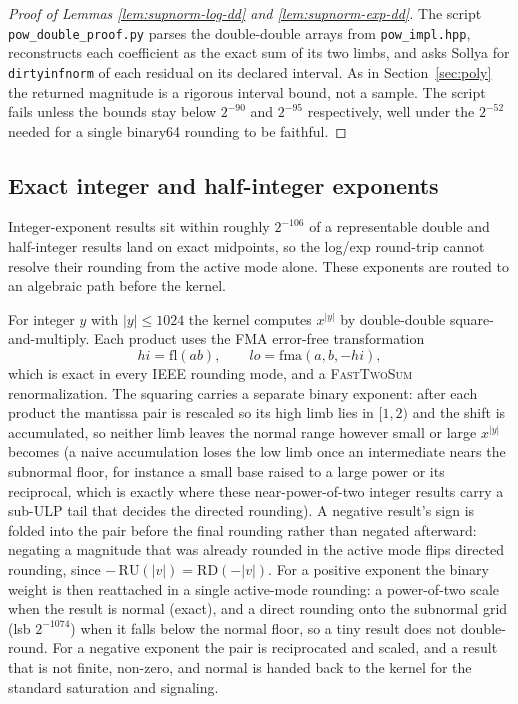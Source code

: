\documentclass[11pt]{article}
\theoremstyle{plain}
\theoremstyle{remark}
\begin{document}
\begin{proof}[Proof of Lemmas \ref{lem:supnorm-log-dd} and \ref{lem:supnorm-exp-dd}]
The script \texttt{pow\_double\_proof.py} parses the double-double arrays from
\texttt{pow\_impl.hpp}, reconstructs each coefficient as the exact sum of its two
limbs, and asks Sollya for \texttt{dirtyinfnorm} of each residual on its declared
interval.  As in Section~\ref{sec:poly} the returned magnitude is a rigorous
interval bound, not a sample.  The script fails unless the bounds stay below
$2^{-90}$ and $2^{-95}$ respectively, well under the $2^{-52}$ needed for a
single binary64 rounding to be faithful.
\end{proof}

\subsection{Exact integer and half-integer exponents}
\label{sec:pow-exact}

Integer-exponent results sit within roughly $2^{-106}$ of a representable double
and half-integer results land on exact midpoints, so the log/exp round-trip
cannot resolve their rounding from the active mode alone.  These exponents are
routed to an algebraic path before the kernel.

For integer $y$ with $|y| \le 1024$ the kernel computes $x^{|y|}$ by
double-double square-and-multiply.  Each product uses the FMA error-free
transformation
\[
  \mathit{hi} = \mathrm{fl}(ab),
  \qquad
  \mathit{lo} = \mathrm{fma}(a,b,-\mathit{hi}),
\]
which is exact in every IEEE rounding mode, and a \textsc{FastTwoSum}
renormalization.  The squaring carries a separate binary exponent: after each
product the mantissa pair is rescaled so its high limb lies in $[1,2)$ and the
shift is accumulated, so neither limb leaves the normal range however small or
large $x^{|y|}$ becomes (a naive accumulation loses the low limb once an
intermediate nears the subnormal floor, for instance a small base raised to a
large power or its reciprocal, which is exactly where these near-power-of-two
integer results carry a sub-ULP tail that decides the directed rounding).  A
negative result's sign is folded into the pair before the final rounding rather
than negated afterward: negating a magnitude that was already rounded in the
active mode flips directed rounding, since
$-\,\mathrm{RU}(|v|) = \mathrm{RD}(-|v|)$.  For a positive exponent the binary
weight is then reattached in a single active-mode rounding: a power-of-two scale
when the result is normal (exact), and a direct rounding onto the subnormal grid
(lsb $2^{-1074}$) when it falls below the normal floor, so a tiny result does not
double-round.  For a negative exponent the pair is reciprocated and scaled, and a
result that is not finite, non-zero, and normal is handed back to the kernel for
the standard saturation and signaling.
\end{document}
